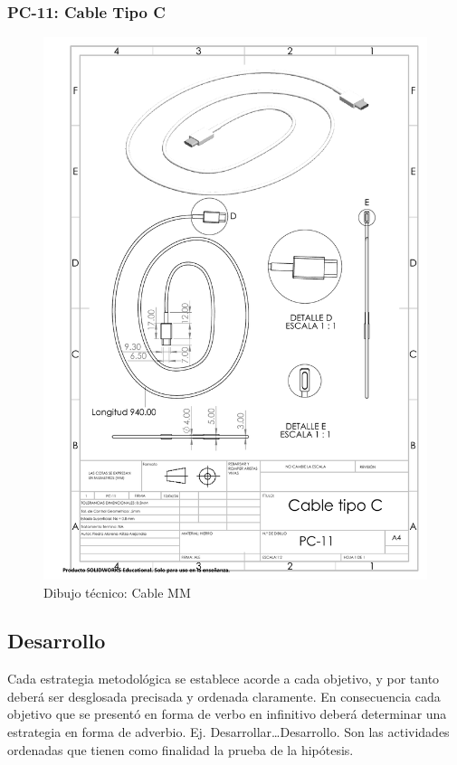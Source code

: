\subsubsection{PC-11: Cable Tipo C }
\begin{figure}[H]
    \centering
    \includegraphics[trim = {7mm 1mm 1mm 1mm},clip,scale=0.4]{22/img/cableCDibujo.PDF}
    \caption{Dibujo técnico: Cable MM}
    \label{fig:enter-label9}
\end{figure}



\subsection{Desarrollo}

Cada estrategia metodológica se establece acorde a cada objetivo, y por tanto deberá ser desglosada precisada y ordenada claramente. En consecuencia cada objetivo que se presentó en forma de verbo en infinitivo deberá determinar una estrategia en forma de adverbio. Ej. Desarrollar…Desarrollo. Son las actividades ordenadas que tienen como finalidad la prueba de la hipótesis. 

